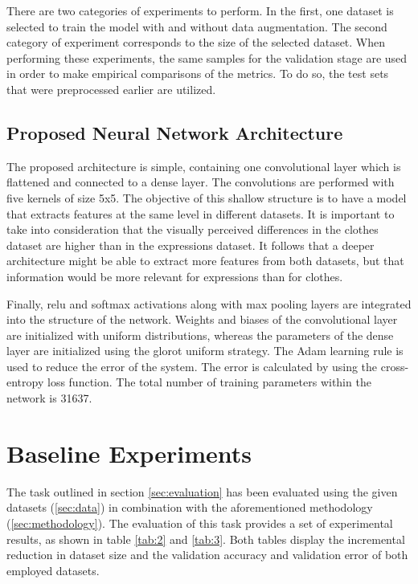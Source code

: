 \documentclass{article}
\begin{document}
There are two categories of experiments to perform. In the first, one dataset is selected to train the model with and without data augmentation. The second category of experiment corresponds to the size of the selected dataset. When performing these experiments, the same samples for the validation stage are used in order to make empirical comparisons of the metrics. To do so, the test sets that were preprocessed earlier are utilized.


\subsection{Proposed Neural Network Architecture}
\label{sec:arch}
The proposed architecture is simple, containing one convolutional layer which is flattened and connected to a dense layer. The convolutions are performed with five kernels of size 5x5. The objective of this shallow structure is to have a model that extracts features at the same level in different datasets. It is important to take into consideration that the visually perceived differences in the clothes dataset are higher than in the expressions dataset. It follows that a deeper architecture might be able to extract more features from both datasets, but that information would be more relevant for expressions than for clothes.

Finally, relu and softmax activations along with max pooling layers are integrated into the structure of the network. Weights and biases of the convolutional layer are initialized with uniform distributions, whereas the parameters of the dense layer are initialized using the glorot uniform strategy. The Adam learning rule is used to reduce the error of the system. The error is calculated by using the cross-entropy loss function. The total number of training parameters within the network is 31637. 


\section{Baseline Experiments}
\label{sec:baseline}
The task outlined in section \ref{sec:evaluation} has been evaluated using the given datasets (\ref{sec:data}) in combination with the aforementioned methodology (\ref{sec:methodology}). The evaluation of this task provides a set of experimental results, as shown in table \ref{tab:2} and \ref{tab:3}. Both tables display the incremental reduction in dataset size and the validation accuracy and validation error of both employed datasets.
\end{document}
